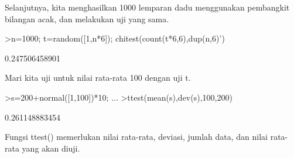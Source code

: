 \documentclass[12pt,arial,letterpaper]{book}
\begin{document}
\begin{eulercomment}
\begin{eulercomment}
\begin{eulercomment}
\begin{eulercomment}
\begin{eulercomment}
\begin{eulercomment}
\begin{eulercomment}
\begin{eulercomment}
\begin{eulercomment}
\begin{eulercomment}
\begin{eulercomment}
\begin{eulercomment}
\begin{eulercomment}
\begin{eulercomment}
\begin{eulercomment}
\begin{eulercomment}
\begin{eulercomment}
\begin{eulercomment}
\begin{eulercomment}
\begin{eulercomment}
\begin{eulercomment}
\begin{eulercomment}
\begin{eulercomment}
\begin{eulercomment}
\begin{eulercomment}
\begin{eulercomment}
\begin{eulercomment}
\begin{eulercomment}
\begin{eulercomment}
\begin{eulercomment}
\begin{eulercomment}
\begin{eulercomment}
\begin{eulercomment}
Selanjutnya, kita menghasilkan 1000 lemparan dadu menggunakan
pembangkit bilangan acak, dan melakukan uji yang sama.
\end{eulercomment}
\begin{eulerprompt}
>n=1000; t=random([1,n*6]); chitest(count(t*6,6),dup(n,6)')
\end{eulerprompt}
\begin{euleroutput}
  0.247506458901
\end{euleroutput}
\begin{eulercomment}
Mari kita uji untuk nilai rata-rata 100 dengan uji t.
\end{eulercomment}
\begin{eulerprompt}
>s=200+normal([1,100])*10; ...
>ttest(mean(s),dev(s),100,200)
\end{eulerprompt}
\begin{euleroutput}
  0.261148883454
\end{euleroutput}
\begin{eulercomment}
Fungsi ttest() memerlukan nilai rata-rata, deviasi, jumlah data, dan
nilai rata-rata yang akan diuji.


\end{eulercomment}
\end{eulercomment}
\end{eulercomment}
\end{eulercomment}
\end{eulercomment}
\end{eulercomment}
\end{eulercomment}
\end{eulercomment}
\end{eulercomment}
\end{eulercomment}
\end{eulercomment}
\end{eulercomment}
\end{eulercomment}
\end{eulercomment}
\end{eulercomment}
\end{eulercomment}
\end{eulercomment}
\end{eulercomment}
\end{eulercomment}
\end{eulercomment}
\end{eulercomment}
\end{eulercomment}
\end{eulercomment}
\end{eulercomment}
\end{eulercomment}
\end{eulercomment}
\end{eulercomment}
\end{eulercomment}
\end{eulercomment}
\end{eulercomment}
\end{eulercomment}
\end{eulercomment}
\end{eulercomment}
\end{document}
